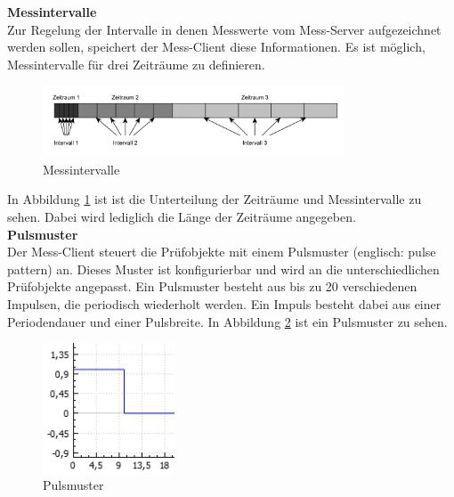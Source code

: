 \textbf{Messintervalle}\\
Zur Regelung der Intervalle in denen Messwerte vom Mess-Server aufgezeichnet werden sollen, speichert der Mess-Client diese Informationen. Es ist möglich, Messintervalle für drei Zeiträume zu definieren.



\begin{figure}[H]
\begin{center}
\includegraphics[width=0.8\textwidth]{img/general/Messintervalle.pdf}
\caption{Messintervalle}
\label{figure_Messintervalle}
\end{center}
\end{figure}

In Abbildung \ref{figure_Messintervalle} ist ist die Unterteilung der Zeiträume und Messintervalle zu sehen. Dabei wird lediglich die Länge der Zeiträume angegeben.\\


\textbf{Pulsmuster}\\
Der Mess-Client steuert die Prüfobjekte mit einem Pulsmuster (englisch: pulse pattern) an. Dieses Muster ist konfigurierbar und wird an die unterschiedlichen Prüfobjekte angepasst. Ein Pulsmuster besteht aus bis zu 20 verschiedenen Impulsen, die periodisch wiederholt werden. Ein Impuls besteht dabei aus einer Periodendauer und einer Pulsbreite. In Abbildung \ref{figure_Pulsepattern} ist ein Pulsmuster zu sehen.\\



\begin{figure}[H]
\begin{center}
\includegraphics[width=0.35\textwidth]{img/general/Pulsepattern.PNG}
\caption{Pulsmuster}
\label{figure_Pulsepattern}
\end{center}
\end{figure}



